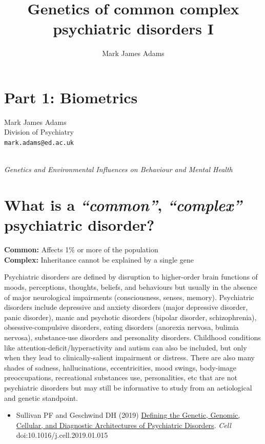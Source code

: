 \documentclass[
  letterpaper,
  DIV=11,
  numbers=noendperiod]{scrartcl}
\title{Genetics of common complex psychiatric disorders I}
\author{Mark James Adams}
\date{}
\providecommand{\tightlist}{%
  \setlength{\itemsep}{0pt}\setlength{\parskip}{0pt}}
\begin{document}
\maketitle


\section{Part 1: Biometrics}\label{part-1-biometrics}

Mark James Adams\\
Division of Psychiatry\\
\texttt{mark.adams@ed.ac.uk}\strut \\
\emph{Genetics and Environmental Influences on Behaviour and Mental
Health}

\section{\texorpdfstring{What is a \emph{``common''}, \emph{``complex''}
psychiatric
disorder?}{What is a ``common'', ``complex'' psychiatric disorder?}}\label{what-is-a-common-complex-psychiatric-disorder}

\textbf{Common:} Affects 1\% or more of the population\\
\textbf{Complex:} Inheritance cannot be explained by a single gene

Psychiatric disorders are defined by disruption to higher-order brain
functions of moods, perceptions, thoughts, beliefs, and behaviours but
usually in the absence of major neurological impairments (consciousness,
senses, memory). Psychiatric disorders include depressive and anxiety
disorders (major depressive disorder, panic disorder), manic and
psychotic disorders (bipolar disorder, schizophrenia),
obsessive-compulsive disorders, eating disorders (anorexia nervosa,
bulimia nervosa), substance-use disorders and personality disorders.
Childhood conditions like attention-deficit/hyperactivity and autism can
also be included, but only when they lead to clinically-salient
impairment or distress. There are also many shades of sadness,
hallucinations, eccentricities, mood swings, body-image preoccupations,
recreational substances use, personalities, etc that are not psychiatric
disorders but may still be informative to study from an aetiological and
genetic standpoint.

\begin{itemize}
\tightlist
\item
  Sullivan PF and Geschwind DH (2019)
  \href{https://doi.org/10.1016/j.cell.2019.01.015}{Defining the
  Genetic, Genomic, Cellular, and Diagnostic Architectures of
  Psychiatric Disorders}. \emph{Cell} doi:10.1016/j.cell.2019.01.015
\end{itemize}
\end{document}
